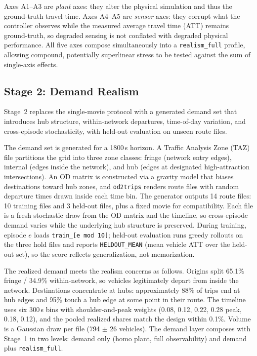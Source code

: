 \documentclass[conference]{IEEEtran}
\newcommand{\realismfull}{\texttt{realism\_full}}
\begin{document}
Axes A1--A3 are \emph{plant} axes: they alter the physical simulation and thus the ground-truth travel time. Axes A4--A5 are \emph{sensor} axes: they corrupt what the controller observes while the measured average travel time (ATT) remains ground-truth, so degraded sensing is not conflated with degraded physical performance. All five axes compose simultaneously into a \realismfull{} profile, allowing compound, potentially superlinear stress to be tested against the sum of single-axis effects.

\subsection{Stage 2: Demand Realism}

Stage~2 replaces the single-movie protocol with a generated demand set that introduces hub structure, within-network departures, time-of-day variation, and cross-episode stochasticity, with held-out evaluation on unseen route files.

The demand set is generated for a 1800\,s horizon. A Traffic Analysis Zone (TAZ) file partitions the grid into three zone classes: fringe (network entry edges), internal (edges inside the network), and hub (edges at designated high-attraction intersections). An OD matrix is constructed via a gravity model that biases destinations toward hub zones, and \texttt{od2trips} renders route files with random departure times drawn inside each time bin. The generator outputs 14 route files: 10 training files and 3 held-out files, plus a fixed movie for compatibility. Each file is a fresh stochastic draw from the OD matrix and the timeline, so cross-episode demand varies while the underlying hub structure is preserved. During training, episode $e$ loads \texttt{train\_[e mod 10]}; held-out evaluation runs greedy rollouts on the three hold files and reports \texttt{HELDOUT\_MEAN} (mean vehicle ATT over the held-out set), so the score reflects generalization, not memorization.

The realized demand meets the realism concerns as follows. Origins split 65.1\% fringe / 34.9\% within-network, so vehicles legitimately depart from inside the network. Destinations concentrate at hubs: approximately 88\% of trips end at hub edges and 95\% touch a hub edge at some point in their route. The timeline uses six 300\,s bins with shoulder-and-peak weights (0.08, 0.12, 0.22, 0.28 peak, 0.18, 0.12), and the pooled realized shares match the design within 0.1\%. Volume is a Gaussian draw per file (794 $\pm$ 26 vehicles). The demand layer composes with Stage~1 in two levels: demand only (homo plant, full observability) and demand plus \realismfull.
\end{document}
